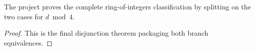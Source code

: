 \begin{theorem}\label{bp_classification}
  \leanok
  The project proves the complete ring-of-integers classification by splitting
  on the two cases for $d \bmod 4$.
\end{theorem}
\begin{proof}
  This is the final disjunction theorem packaging both branch equivalences.
\end{proof}
